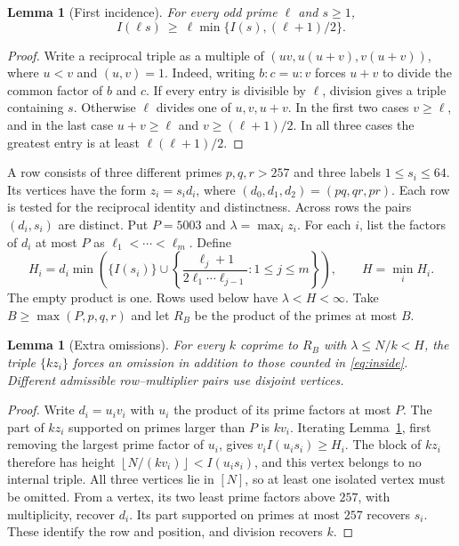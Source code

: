 \documentclass[11pt,letterpaper]{article}
\newtheorem{lemma}[theorem]{Lemma}
\theoremstyle{definition}
\newcommand{\floor}[1]{\left\lfloor #1\right\rfloor}
\begin{document}
\begin{lemma}[First incidence]\label{lem:incidence}
For every odd prime $\ell$ and $s\ge1$,
\[
 I(\ell s)\ \ge\ \ell\min\{I(s),(\ell+1)/2\}.
\]
\end{lemma}
\begin{proof}
Write a reciprocal triple as a multiple of
$(uv,u(u+v),v(u+v))$, where $u<v$ and $(u,v)=1$.
Indeed, writing $b:c=u:v$ forces $u+v$ to divide the common factor
of $b$ and $c$. If every entry is divisible by $\ell$, division gives
a triple containing $s$. Otherwise $\ell$ divides one of $u,v,u+v$.
In the first two cases $v\ge\ell$, and in the last case $u+v\ge\ell$
and $v\ge(\ell+1)/2$. In all three cases the greatest entry is at
least $\ell(\ell+1)/2$.
\end{proof}

A row consists of three different primes $p,q,r>257$ and three
labels $1\le s_i\le64$. Its vertices have the form $z_i=s_i d_i$, where
$(d_0,d_1,d_2)=(pq,qr,pr)$. Each row is tested for the reciprocal
identity and distinctness. Across rows the pairs $(d_i,s_i)$ are
distinct. Put $P=5003$ and $\lambda=\max_i z_i$. For each $i$, list
the factors of $d_i$ at most $P$ as $\ell_1<\cdots<\ell_m$. Define
\[
 H_i=d_i\min\left(\{I(s_i)\}\cup
     \left\{\frac{\ell_j+1}{2\ell_1\cdots\ell_{j-1}}:
          1\le j\le m\right\}\right),
 \qquad H=\min_i H_i .
\]
The empty product is one. Rows used below have $\lambda<H<\infty$.
Take $B\ge\max(P,p,q,r)$ and let $R_B$ be the product of the primes
at most $B$.

\begin{lemma}[Extra omissions]\label{lem:exterior}
For every $k$ coprime to $R_B$ with $\lambda\le N/k<H$, the triple
$\{kz_i\}$ forces an omission in addition to those counted in
\eqref{eq:inside}. Different admissible row--multiplier pairs use
disjoint vertices.
\end{lemma}
\begin{proof}
Write $d_i=u_i v_i$ with $u_i$ the product of its prime factors at
most $P$. The part of $kz_i$ supported on primes larger than $P$ is
$kv_i$. Iterating Lemma~\ref{lem:incidence}, first removing the largest
prime factor of $u_i$, gives $v_i I(u_i s_i)\ge H_i$. The block of
$kz_i$ therefore has height $\floor{N/(kv_i)}<I(u_i s_i)$, and this
vertex belongs to no internal triple. All three vertices lie in $[N]$,
so at least one isolated vertex must be omitted. From a vertex, its two
least prime factors above $257$, with multiplicity, recover $d_i$. Its
part supported on primes at most $257$ recovers $s_i$. These identify
the row and position, and division recovers $k$.
\end{proof}
\end{document}
